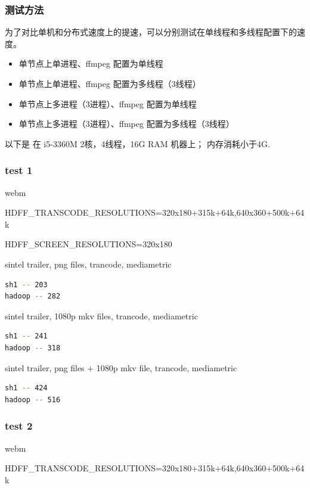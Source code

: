 \subsubsection{测试方法}

为了对比单机和分布式速度上的提速，可以分别测试在单线程和多线程配置下的速度。

\begin{itemize}
  \item 单节点上单进程、ffmpeg 配置为单线程
  \item 单节点上单进程、ffmpeg 配置为多线程（3线程）
  \item 单节点上多进程（3进程）、ffmpeg 配置为单线程
  \item 单节点上多进程（3进程）、ffmpeg 配置为多线程（3线程）
  
\end{itemize}





以下是
在 i5-3360M 2核，4线程，16G RAM 机器上；
内存消耗小于4G.

\subsubsection{test 1}
webm

HDFF\_TRANSCODE\_RESOLUTIONS=320x180+315k+64k,640x360+500k+64k

HDFF\_SCREEN\_RESOLUTIONS=320x180


sintel trailer, png files, trancode, mediametric
\begin{lstlisting}[language=bash]
sh1 -- 203
hadoop -- 282
\end{lstlisting}


sintel trailer, 1080p mkv files, trancode, mediametric
\begin{lstlisting}[language=bash]
sh1 -- 241
hadoop -- 318
\end{lstlisting}


sintel trailer, png files + 1080p mkv file, trancode, mediametric
\begin{lstlisting}[language=bash]
sh1 -- 424
hadoop -- 516
\end{lstlisting}


\subsubsection{test 2}
webm

HDFF\_TRANSCODE\_RESOLUTIONS=320x180+315k+64k,640x360+500k+64k

